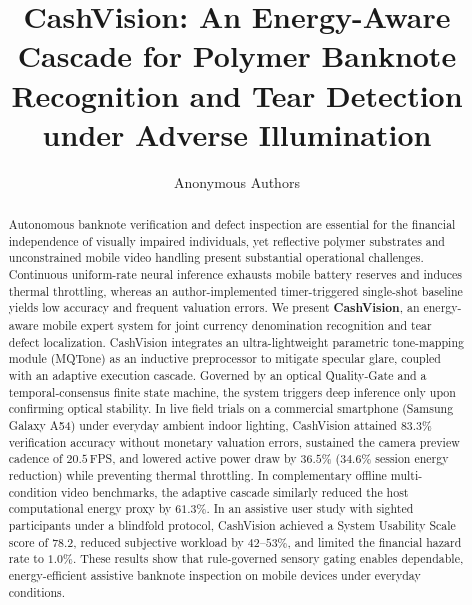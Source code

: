 \documentclass[final,5p,times,twocolumn,authoryear]{elsarticle}
\begin{document}
\begin{frontmatter}



\title{CashVision: An Energy-Aware Cascade for Polymer Banknote Recognition and Tear Detection under Adverse Illumination}

\author{Anonymous Authors}
\begin{abstract}
Autonomous banknote verification and defect inspection are essential for the financial independence of visually impaired individuals, yet reflective polymer substrates and unconstrained mobile video handling present substantial operational challenges. Continuous uniform-rate neural inference exhausts mobile battery reserves and induces thermal throttling, whereas an author-implemented timer-triggered single-shot baseline yields low accuracy and frequent valuation errors. We present \textbf{CashVision}, an energy-aware mobile expert system for joint currency denomination recognition and tear defect localization. CashVision integrates an ultra-lightweight parametric tone-mapping module (MQTone) as an inductive preprocessor to mitigate specular glare, coupled with an adaptive execution cascade. Governed by an optical Quality-Gate and a temporal-consensus finite state machine, the system triggers deep inference only upon confirming optical stability. In live field trials on a commercial smartphone (Samsung Galaxy A54) under everyday ambient indoor lighting, CashVision attained $83.3\%$ verification accuracy without monetary valuation errors, sustained the camera preview cadence of $20.5$\,FPS, and lowered active power draw by $36.5\%$ ($34.6\%$ session energy reduction) while preventing thermal throttling. In complementary offline multi-condition video benchmarks, the adaptive cascade similarly reduced the host computational energy proxy by $61.3\%$. In an assistive user study with sighted participants under a blindfold protocol, CashVision achieved a System Usability Scale score of $78.2$, reduced subjective workload by $42$--$53\%$, and limited the financial hazard rate to $1.0\%$. These results show that rule-governed sensory gating enables dependable, energy-efficient assistive banknote inspection on mobile devices under everyday conditions.
\end{abstract}


\end{frontmatter}
\end{document}
